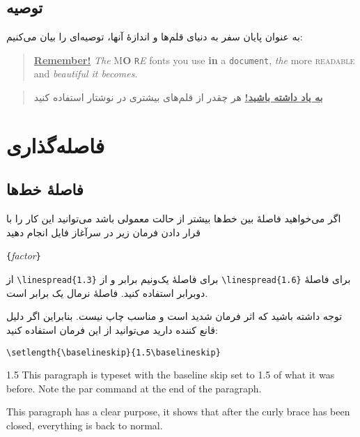 \subsection{توصیه}
به عنوان پایان سفر به دنیای قلم‌ها و اندازهٔ آنها، توصیه‌ای را بیان می‌کنیم:\nopagebreak


\setLR
\begin{quote}
  \underline{\textbf{Remember\Huge!}} \textit{The}
  \textsf{M\textbf{\LARGE O} \texttt{R}\textsl{E}} fonts \Huge you
  \tiny use \footnotesize \textbf{in} a \small \texttt{document},
  \large \textit{the} \normalsize more \textsc{readable} and
  \textsl{\textsf{beautiful} it bec\large o\Large m\LARGE e\huge s}.
\end{quote}
\setRL


\begin{quote}
  \underline{\textbf{به یاد داشته باشید\Huge!}} {\farsifontnavaar هر چقدر از}
{\farsifontsayeh قلم‌های بیشتری}
{\farsifontpook در نوشتار}
{\farsifontscheherazade استفاده کنید}
\end{quote}

\section{فاصله‌گذاری}
\subsection{فاصلهٔ خط‌ها}
اگر می‌خواهید فاصلهٔ بین خط‌ها بیشتر از حالت معمولی باشد می‌توانید این کار را با قرار دادن فرمان زیر در سرآغاز فایل انجام دهید

\begin{lscommand}
\verb|{|\emph{factor}\verb|}|
\end{lscommand}

از \verb|\linespread{1.3}| برای فاصلهٔ یک‌ونیم برابر و از  \verb|\linespread{1.6}| برای فاصلهٔ دوبرابر استفاده کنید. فاصلهٔ نرمال یک برابر است.

توجه داشته باشید که اثر فرمان  شدید است و مناسب چاپ نیست. بنابراین اگر دلیل قانع کننده دارید می‌توانید از این فرمان استفاده کنید:

\begin{lscommand}
\verb|\setlength{\baselineskip}{1.5\baselineskip}|
\end{lscommand}


\begin{example}
{\setlength{\baselineskip}%
           {1.5\baselineskip}
This paragraph is typeset with
the baseline skip set to 1.5 of
what it was before. Note the par
command at the end of the
paragraph.\par}

This paragraph has a clear
purpose, it shows that after the
curly brace has been closed,
everything is back to normal.
\end{example}

